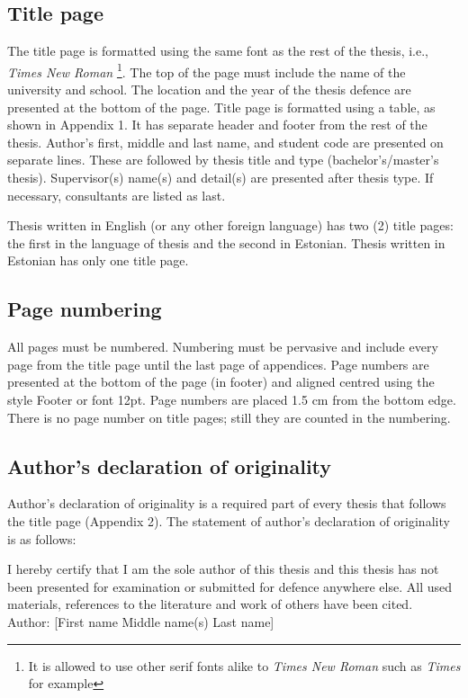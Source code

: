 \newpage
\subsection{Title page}
The title page is formatted using the same font as the rest of the
thesis, i.e., \textit{Times New Roman} \footnote{It is allowed to use
  other serif fonts alike to \textit{Times New Roman} such as
  \textit{Times} for example}. The top of the page must include the name
of the university and school. The location and the year of the thesis
defence are presented at the bottom of the page. Title page is
formatted using a table, as shown in Appendix 1. It has separate
header and footer from the rest of the thesis. Author’s first, middle
and last name, and student code are presented on separate lines. These
are followed by thesis title and type (bachelor’s/master’s
thesis). Supervisor(s) name(s) and detail(s) are presented after
thesis type. If necessary, consultants are listed as last.

Thesis written in English (or any other foreign language) has two (2)
title pages: the first in the language of thesis and the second in
Estonian. Thesis written in Estonian has only one title page.

\subsection{Page numbering}
All pages must be numbered. Numbering must be pervasive and include
every page from the title page until the last page of appendices. Page
numbers are presented at the bottom of the page (in footer) and
aligned centred using the style Footer or font 12pt. Page numbers are
placed 1.5 cm from the bottom edge. There is no page number on title
pages; still they are counted in the numbering.

\subsection{Author’s declaration of originality}
Author’s declaration of originality is a required part of every thesis
that follows the title page (Appendix 2). The statement of author’s
declaration of originality is as follows:

\begin{tcolorbox}[arc=0pt, outer arc=0pt, boxrule=0pt, left=0mm]
  I hereby certify that I am the sole author of this thesis and this
  thesis has not been presented for examination or submitted for defence
  anywhere else. All used materials, references to the literature and
  work of others have been cited.\\

  Author: [First name Middle name(s) Last name] \\ \relax
  [dd.mm.yyyy]
\end{tcolorbox}

